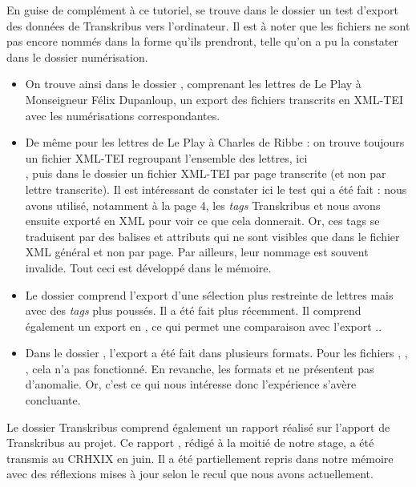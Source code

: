En guise de complément à ce tutoriel, se trouve dans le dossier  un test d'export des données de Transkribus vers l'ordinateur. Il est à noter que les fichiers ne sont pas encore nommés dans la forme qu'ils prendront, telle qu'on a pu la constater dans le dossier numérisation. 
\begin{itemize}
    \item On trouve ainsi dans le dossier , comprenant les lettres de Le Play à Monseigneur Félix Dupanloup, un export des fichiers transcrits en XML-TEI avec les numérisations correspondantes. 
    \item De même pour les lettres de Le Play à Charles de Ribbe  : on trouve toujours un fichier XML-TEI regroupant l'ensemble des lettres, ici\\ , puis dans le dossier  un fichier XML-TEI par page transcrite (et non par lettre transcrite). Il est intéressant de constater ici le test qui a été fait : nous avons utilisé, notamment à la page 4, les \emph{tags} Transkribus et nous avons ensuite exporté en XML pour voir ce que cela donnerait. Or, ces tags se traduisent par des balises et attributs qui ne sont visibles que dans le fichier XML général et non par page. Par ailleurs, leur nommage est souvent invalide. Tout ceci est développé dans le mémoire.
    \item Le dossier  comprend l'export d'une sélection plus restreinte de lettres mais avec des \emph{tags} plus poussés. Il a été fait plus récemment. Il comprend également un export en , ce qui permet une comparaison avec l'export ..
    \item Dans le dossier , l'export a été fait dans plusieurs formats. Pour les fichiers , , , cela n'a pas fonctionné. En revanche, les formats  et  ne présentent pas d'anomalie. Or, c'est ce qui nous intéresse donc l'expérience s'avère concluante.
\end{itemize}


Le dossier Transkribus comprend également un rapport réalisé sur l'apport de Transkribus au projet.
Ce rapport , rédigé à la moitié de notre stage, a été transmis au CRHXIX en juin. Il a été partiellement repris dans notre mémoire avec des réflexions mises à jour selon le recul que nous avons actuellement.



